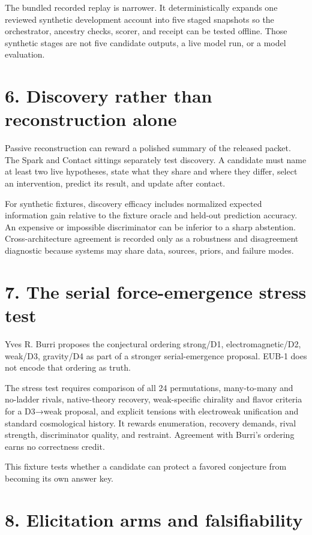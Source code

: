 \documentclass[
  english,
]{article}
\begin{document}
The bundled recorded replay is narrower. It deterministically expands
one reviewed synthetic development account into five staged snapshots so
the orchestrator, ancestry checks, scorer, and receipt can be tested
offline. Those synthetic stages are not five candidate outputs, a live
model run, or a model evaluation.

\section{6. Discovery rather than reconstruction
alone}\label{discovery-rather-than-reconstruction-alone}

Passive reconstruction can reward a polished summary of the released
packet. The Spark and Contact sittings separately test discovery. A
candidate must name at least two live hypotheses, state what they share
and where they differ, select an intervention, predict its result, and
update after contact.

For synthetic fixtures, discovery efficacy includes normalized expected
information gain relative to the fixture oracle and held-out prediction
accuracy. An expensive or impossible discriminator can be inferior to a
sharp abstention. Cross-architecture agreement is recorded only as a
robustness and disagreement diagnostic because systems may share data,
sources, priors, and failure modes.

\section{7. The serial force-emergence stress
test}\label{the-serial-force-emergence-stress-test}

Yves R. Burri proposes the conjectural ordering strong/D1,
electromagnetic/D2, weak/D3, gravity/D4 as part of a stronger
serial-emergence proposal. EUB-1 does not encode that ordering as truth.

The stress test requires comparison of all 24 permutations, many-to-many
and no-ladder rivals, native-theory recovery, weak-specific chirality
and flavor criteria for a D3→weak proposal, and explicit tensions with
electroweak unification and standard cosmological history. It rewards
enumeration, recovery demands, rival strength, discriminator quality,
and restraint. Agreement with Burri's ordering earns no correctness
credit.

This fixture tests whether a candidate can protect a favored conjecture
from becoming its own answer key.

\section{8. Elicitation arms and
falsifiability}\label{elicitation-arms-and-falsifiability}
\end{document}
